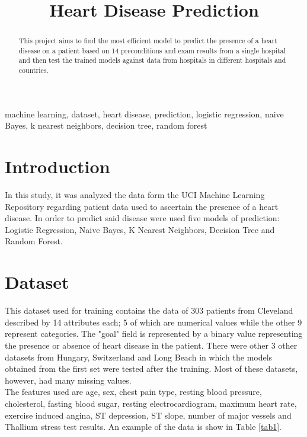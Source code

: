 \documentclass[conference]{IEEEtran}
\begin{document}
\title{Heart Disease Prediction}

\author{
}

\maketitle

\begin{abstract}
    This project aims to find the most efficient model to predict the presence of a heart disease on a patient based on 14 preconditions and exam results from a single hospital and then test the trained models against data from hospitals in different hospitals and countries.
\end{abstract}

\begin{IEEEkeywords}
    machine learning, dataset, heart disease, prediction, logistic regression, naive Bayes, k nearest neighbors, decision tree, random forest
\end{IEEEkeywords}

\section{Introduction}
In this study, it was analyzed the data form the UCI Machine Learning Repository\cite{b5} regarding patient data used to ascertain the presence of a heart disease. In order to predict said disease were used five models of prediction: Logistic Regression, Naive Bayes, K Nearest Neighbors, Decision Tree and Random Forest.

\section{Dataset}
This dataset used for training contains the data of 303 patients from Cleveland\cite{b4} described by 14 attributes each; 5 of which are numerical values while the other 9 represent categories. The "goal" field is represented by a binary value representing the presence or absence of heart disease in the patient. There were other 3 other datasets from Hungary\cite{b1}, Switzerland\cite{b2,b3} and Long Beach\cite{b4} in which the models obtained from the first set were tested after the training. Most of these datasets, however, had many missing values.\\
The features used are age, sex, chest pain type, resting blood pressure, cholesterol, fasting blood sugar, resting electrocardiogram, maximum heart rate, exercise induced angina, ST depression, ST slope, number of major vessels and Thallium stress test results. An example of the data is show in Table \ref{tab1}.
\end{document}
